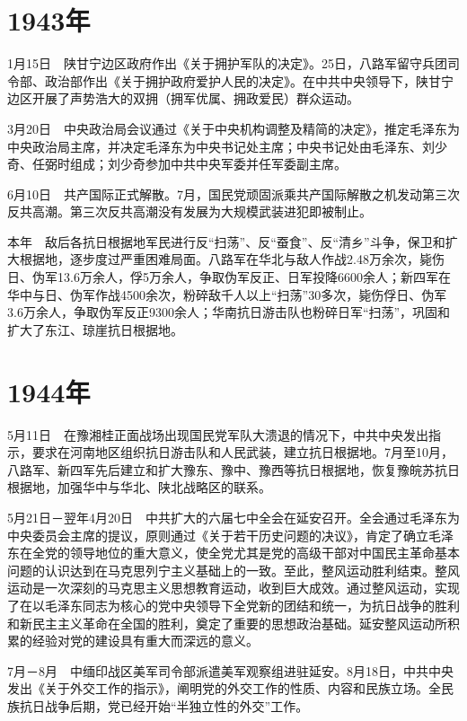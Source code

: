 \documentclass[10pt,a4paper,twocolumn]{book}
\begin{document}
\section{1943年}

1月15日　陕甘宁边区政府作出《关于拥护军队的决定》。25日，八路军留守兵团司令部、政治部作出《关于拥护政府爱护人民的决定》。在中共中央领导下，陕甘宁边区开展了声势浩大的双拥（拥军优属、拥政爱民）群众运动。

3月20日　中央政治局会议通过《关于中央机构调整及精简的决定》，推定毛泽东为中央政治局主席，并决定毛泽东为中央书记处主席；中央书记处由毛泽东、刘少奇、任弼时组成；刘少奇参加中共中央军委并任军委副主席。

6月10日　共产国际正式解散。7月，国民党顽固派乘共产国际解散之机发动第三次反共高潮。第三次反共高潮没有发展为大规模武装进犯即被制止。

本年　敌后各抗日根据地军民进行反“扫荡”、反“蚕食”、反“清乡”斗争，保卫和扩大根据地，逐步度过严重困难局面。八路军在华北与敌人作战2.48万余次，毙伤日、伪军13.6万余人，俘5万余人，争取伪军反正、日军投降6600余人；新四军在华中与日、伪军作战4500余次，粉碎敌千人以上“扫荡”30多次，毙伤俘日、伪军3.6万余人，争取伪军反正9300余人；华南抗日游击队也粉碎日军“扫荡”，巩固和扩大了东江、琼崖抗日根据地。

\section{1944年}

5月11日　在豫湘桂正面战场出现国民党军队大溃退的情况下，中共中央发出指示，要求在河南地区组织抗日游击队和人民武装，建立抗日根据地。7月至10月，八路军、新四军先后建立和扩大豫东、豫中、豫西等抗日根据地，恢复豫皖苏抗日根据地，加强华中与华北、陕北战略区的联系。

5月21日－翌年4月20日　中共扩大的六届七中全会在延安召开。全会通过毛泽东为中央委员会主席的提议，原则通过《关于若干历史问题的决议》，肯定了确立毛泽东在全党的领导地位的重大意义，使全党尤其是党的高级干部对中国民主革命基本问题的认识达到在马克思列宁主义基础上的一致。至此，整风运动胜利结束。整风运动是一次深刻的马克思主义思想教育运动，收到巨大成效。通过整风运动，实现了在以毛泽东同志为核心的党中央领导下全党新的团结和统一，为抗日战争的胜利和新民主主义革命在全国的胜利，奠定了重要的思想政治基础。延安整风运动所积累的经验对党的建设具有重大而深远的意义。

7月－8月　中缅印战区美军司令部派遣美军观察组进驻延安。8月18日，中共中央发出《关于外交工作的指示》，阐明党的外交工作的性质、内容和民族立场。全民族抗日战争后期，党已经开始“半独立性的外交”工作。
\end{document}
